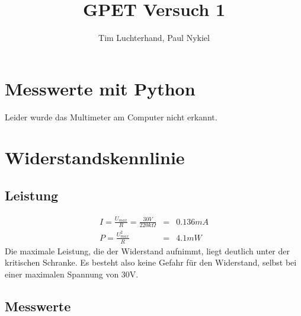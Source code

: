 \documentclass[10pt]{report}
\author{Tim Luchterhand, Paul Nykiel}
\title{GPET Versuch 1}
\begin{document}
        \maketitle
        \section{Messwerte mit Python}
        Leider wurde das Multimeter am Computer nicht erkannt.

        \section{Widerstandskennlinie}
        \subsection{Leistung}
        \begin{eqnarray*}
            I = \frac{U_{max}}{R} = \frac{30V}{220k \Omega} &=& 0.136 mA\\
            P = \frac{U_{max}^2}{R} &=& 4.1 mW
        \end{eqnarray*}
        \noindent Die maximale Leistung, die der Widerstand aufnimmt, liegt deutlich
        unter der kritischen Schranke. Es besteht also keine Gefahr für den Widerstand,
        selbst bei einer maximalen Spannung von 30V.
        \subsection{Messwerte}
\end{document}
